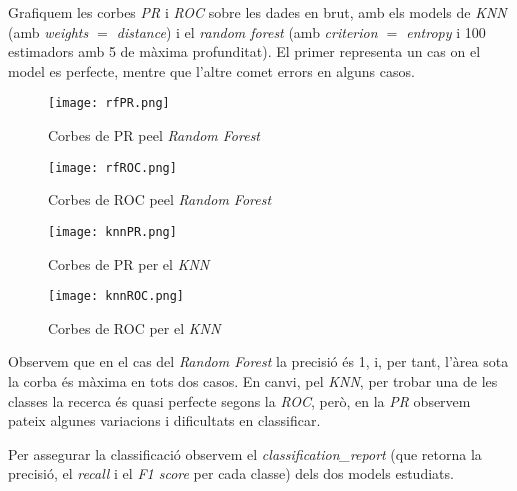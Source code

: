 \documentclass[a4paper, 11pt]{article}
\begin{document}
        Grafiquem les corbes \textit{PR} i \textit{ROC} sobre les dades en brut, amb els models de \textit{KNN} (amb \textit{weights $=$ distance}) i el \textit{random forest} (amb \textit{criterion $=$ entropy} i 100 estimadors amb 5 de màxima profunditat). El primer representa un cas on el model es perfecte, mentre que l'altre comet errors en alguns casos.

        \begin{figure}[H]
            \centering
            \texttt{[image: rfPR.png]}
            \caption{Corbes de PR peel \textit{Random Forest}}
        \end{figure}
        \begin{figure}[H]
            \centering
            \texttt{[image: rfROC.png]}
            \caption{Corbes de ROC peel \textit{Random Forest}}
            \end{figure}

        \begin{figure}[H]
            \centering
            \texttt{[image: knnPR.png]}
            \caption{Corbes de PR per el \textit{KNN}}
            \end{figure}
        \begin{figure}[H]
            \centering
            \texttt{[image: knnROC.png]}
            \caption{Corbes de ROC per el \textit{KNN}}
            \end{figure}
        Observem que en el cas del \textit{Random Forest} la precisió és 1, i, per tant, l'àrea sota la corba és màxima en tots dos casos.
        En canvi, pel \textit{KNN}, per trobar una de les classes la recerca és quasi perfecte segons la \textit{ROC}, però, en la \textit{PR} observem pateix algunes variacions i dificultats en classificar.

        Per assegurar la classificació observem el \textit{classification\_report} (que retorna la precisió, el \textit{recall} i el \textit{F1 score} per cada classe) dels dos models estudiats.
\end{document}
